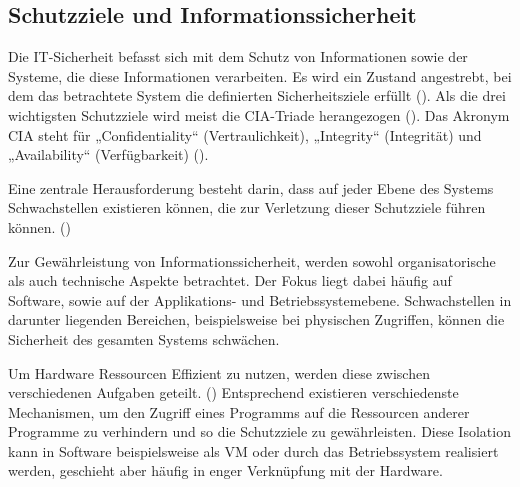 
\subsection{Schutzziele und Informationssicherheit}
Die IT-Sicherheit befasst sich mit dem Schutz von
Informationen sowie der Systeme, die diese Informationen
verarbeiten. Es wird ein Zustand angestrebt, bei dem das
betrachtete System die definierten Sicherheitsziele erfüllt
(\cite[16]{von_faber_it_2021}).
Als die drei wichtigsten Schutzziele wird meist die CIA-Triade
herangezogen (\cite[21]{liedtke_informationssicherheit_2022}).
Das Akronym CIA steht für „Confidentiality“ (Vertraulichkeit),
„Integrity“ (Integrität) und
„Availability“ (Verfügbarkeit) (\cite[12]{von_faber_it_2021}).

Eine zentrale Herausforderung besteht darin, dass auf jeder
Ebene des Systems
Schwachstellen existieren können, die zur Verletzung dieser
Schutzziele führen können.
(\cite[19]{liedtke_informationssicherheit_2022})

Zur Gewährleistung von Informationssicherheit, werden sowohl
organisatorische als auch technische Aspekte betrachtet. Der
Fokus liegt dabei häufig auf Software, sowie auf der
Applikations- und Betriebssystemebene.
Schwachstellen in darunter liegenden Bereichen,
beispielsweise bei physischen Zugriffen, können die Sicherheit
des gesamten Systems schwächen.

Um Hardware Ressourcen Effizient
zu nutzen, werden diese zwischen verschiedenen Aufgaben geteilt.
(\cite[44]{kamp_building_2004})
Entsprechend existieren verschiedenste Mechanismen, um den Zugriff
eines Programms auf die Ressourcen anderer Programme zu
verhindern und so die Schutzziele zu gewährleisten. Diese
Isolation kann in Software beispielsweise als \ac{VM} oder durch
das Betriebssystem realisiert werden, geschieht aber häufig in
enger Verknüpfung mit der Hardware.

